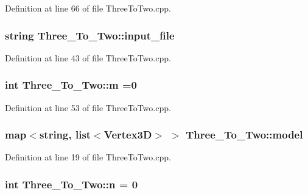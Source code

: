 Definition at line 66 of file Three\+To\+Two.\+cpp.

\subsubsection[{\texorpdfstring{input\+\_\+file}{input_file}}]{\setlength{\rightskip}{0pt plus 5cm}string Three\+\_\+\+To\+\_\+\+Two\+::input\+\_\+file}\hypertarget{class_three___to___two_acdd6380173d6df1ce3d72c911ba0f1af}{}\label{class_three___to___two_acdd6380173d6df1ce3d72c911ba0f1af}


Definition at line 43 of file Three\+To\+Two.\+cpp.

\subsubsection[{\texorpdfstring{m}{m}}]{\setlength{\rightskip}{0pt plus 5cm}int Three\+\_\+\+To\+\_\+\+Two\+::m =0}\hypertarget{class_three___to___two_a9e131241a48170afd8af54e30ee95ded}{}\label{class_three___to___two_a9e131241a48170afd8af54e30ee95ded}


Definition at line 53 of file Three\+To\+Two.\+cpp.

\subsubsection[{\texorpdfstring{model}{model}}]{\setlength{\rightskip}{0pt plus 5cm}map$<$string, list$<${\bf Vertex3D}$>$ $>$ Three\+\_\+\+To\+\_\+\+Two\+::model}\hypertarget{class_three___to___two_ab89e25f994881aea2bdae437e397f970}{}\label{class_three___to___two_ab89e25f994881aea2bdae437e397f970}


Definition at line 19 of file Three\+To\+Two.\+cpp.

\subsubsection[{\texorpdfstring{n}{n}}]{\setlength{\rightskip}{0pt plus 5cm}int Three\+\_\+\+To\+\_\+\+Two\+::n = 0}\hypertarget{class_three___to___two_a3893134e478349a3df093541bc35f406}{}\label{class_three___to___two_a3893134e478349a3df093541bc35f406}


